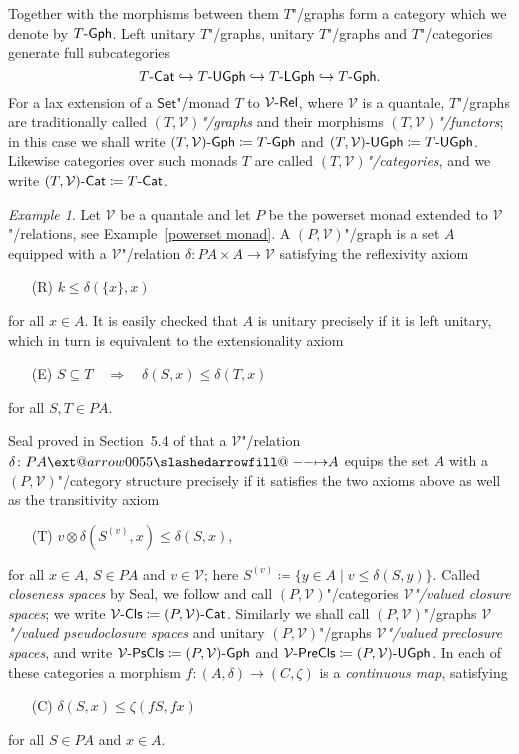 \documentclass[preprint, a4paper]{elsarticle}
\makeatletter
\def\slashedarrowfill@#1#2#3#4#5{%
  $\m@th\thickmuskip0mu\medmuskip\thickmuskip\thinmuskip\thickmuskip
   \relax#5#1\mkern-7mu%
   \cleaders\hbox{$#5\mkern-2mu#2\mkern-2mu$}\hfill
   \mathclap{#3}\mathclap{#2}%
   \cleaders\hbox{$#5\mkern-2mu#2\mkern-2mu$}\hfill
   \mkern-7mu#4$%
}
\def\rightslashedarrowfill@{%
  \slashedarrowfill@\relbar\relbar\mapstochar\rightarrow}
\newcommand\xslashedrightarrow[2][]{%
  \ext@arrow 0055{\rightslashedarrowfill@}{#1}{#2}}
\def\slashedrightarrow{\xslashedrightarrow{}}
\theoremstyle{definition}
\theoremstyle{remark}
\newtheorem{example}[theorem]{Example}
\providecommand{\exref}[1]{Example~\ref{#1}}
\renewcommand{\implies}{\Rightarrow}
\providecommand{\dfn}{\coloneqq}
\providecommand{\into}{\hookrightarrow}
\providecommand{\tens}{\otimes}
\providecommand{\brcs}[1]{\lbrace #1 \rbrace}
\providecommand{\set}[1]{\brcs{#1}}
\providecommand{\map}[3]{#1\colon#2\to#3}
\providecommand{\hmap}[3]{#1\colon#2\slashedrightarrow#3}
\providecommand{\catvar}[1]{\mathcal{#1}}
\providecommand{\2}{\mathsf 2}
\providecommand{\V}{\catvar V}
\providecommand{\Set}{\mathsf{Set}}
\providecommand{\Cat}{\mathsf{Cat}}
\providecommand{\enCat}[1]{#1\text-\Cat}
\providecommand{\Cls}[1]{#1\text-\mathsf{Cls}}
\providecommand{\PsCls}[1]{#1\text-\mathsf{PsCls}}
\providecommand{\PreCls}[1]{#1\text-\mathsf{PreCls}}
\providecommand{\Rel}{\mathsf{Rel}}
\providecommand{\enRel}[1]{#1\text-\Rel}
\providecommand{\Gph}[1]{#1\text-\mathsf{Gph}}
\providecommand{\UGph}[1]{#1\text-\mathsf{UGph}}
\providecommand{\LGph}[1]{#1\text-\mathsf{LGph}}
\makeatother
\begin{document}
  Together with the morphisms between them $T$"/graphs form a category which we denote by $\Gph T$. Left unitary $T$"/graphs, unitary $T$"/graphs and $T$"/categories generate full subcategories
  \begin{equation} \label{subcategories}
  	\enCat T \into \UGph T \into \LGph T \into \Gph T.
  \end{equation}
  For a lax extension of a $\Set$"/monad $T$ to $\enRel\V$, where $\V$ is a quantale, $T$"/graphs are traditionally called \emph{$(T, \V)$"/graphs} and their morphisms \emph{$(T, \V)$"/functors}; in this case we shall write $\Gph{(T, \V)} \dfn \Gph T$ and $\UGph{(T, \V)} \dfn \UGph T$. Likewise categories over such monads $T$ are called \emph{$(T, \V)$"/categories}, and we write $\enCat{(T, \V)} \dfn \enCat T$.
  \begin{example} \label{closure space}
  	Let $\V$ be a quantale and let $P$ be the powerset monad extended to $\V$"/relations, see \exref{powerset monad}. A $(P, \V)$"/graph is a set $A$ equipped with a $\V$"/relation $\map\delta{PA \times A}\V$ satisfying the reflexivity axiom
  	\begin{enumerate}
  		\item[(R)] $k \leq \delta(\set x, x)$
  	\end{enumerate}
  	for all $x \in A$. It is easily checked that $A$ is unitary precisely if it is left unitary, which in turn is equivalent to the extensionality axiom
  	\begin{enumerate}
  		\item[(E)] $S \subseteq T \quad \implies \quad \delta(S, x) \leq \delta(T, x)$
  	\end{enumerate}
  	for all $S, T \in PA$.
  	
  	Seal proved in Section~5.4 of \cite{Seal05} that a $\V$"/relation $\hmap\delta{PA}A$ equips the set $A$ with a $(P, \V)$"/category structure precisely if it satisfies the two axioms above as well as the transitivity axiom
		\begin{enumerate}
			\item[(T)] $v \tens \delta(S^{(v)}, x) \leq \delta(S, x)$,
		\end{enumerate}
		for all $x \in A$, $S \in PA$ and $v \in \V$; here $S^{(v)} \dfn \set{y \in A \mid v \leq \delta(S, y)}$. Called \emph{closeness spaces} by Seal, we follow \cite{Lai-Tholen17a} and call $(P, \V)$"/categories \emph{$\V$"/valued closure spaces}; we write $\Cls\V \dfn \enCat{(P, \V)}$. Similarly we shall call $(P, \V)$"/graphs \emph{$\V$"/valued pseudoclosure spaces} and unitary $(P, \V)$"/graphs \emph{$\V$"/valued preclosure spaces}, and write $\PsCls\V \dfn \Gph{(P, \V)}$ and $\PreCls\V \dfn \UGph{(P, \V)}$. In each of these categories a morphism $\map f{(A, \delta)}{(C, \zeta)}$ is a \emph{continuous map}, satisfying
		\begin{enumerate}
			\item[(C)] $\delta(S, x) \leq \zeta(fS, fx)$
		\end{enumerate}
		for all $S \in PA$ and $x \in A$.
		

\end{example}
\end{document}
